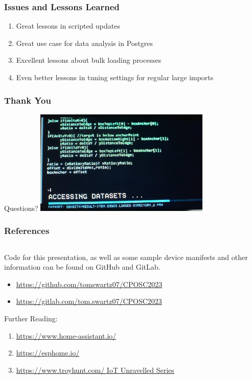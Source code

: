 \documentclass[aspectratio=169]{beamer}
\begin{document}
\begin{frame}[fragile]
  \frametitle{Issues and Lessons Learned}
  \begin{enumerate}
    \item{Great lessons in scripted updates}
    \item{Great use case for data analysis in Postgres}
    \item{Excellent lessons about bulk loading processes}
    \item{Even better lessons in tuning settings for regular large imports}
  \end{enumerate}
\end{frame}

\begin{frame}
  \frametitle{Thank You}
  \begin{center}
    \LARGE{Questions?}
    \vfill
    \includegraphics[height=5cm]{images/lol-code.jpg}
  \end{center}
\end{frame}
\begin{frame}
  \frametitle{References}
  \begin{columns}[]
    \begin{column}[T]{0.55\paperwidth}
      Code for this presentation, as well as some sample device manifests and other
      information can be found on GitHub and GitLab.
      \begin{itemize}
        \item{\href{https://github.com/tomswartz07/CPOSC2023}{https://github.com/tomswartz07/CPOSC2023}}
        \item{\href{https://gitlab.com/tom.swartz07/CPOSC2023}{https://gitlab.com/tom.swartz07/CPOSC2023}}
      \end{itemize}
      \vfill
      Further Reading:
      \begin{enumerate}
        \item{\href{https://www.home-assistant.io/}{https://www.home-assistant.io/}}
        \item{\href{https://esphome.io/}{https://esphome.io/}}
        \item{\href{https://www.troyhunt.com/iot-unravelled-part-1-its-a-mess-but-then-theres-home-assistant/}{https://www.troyhunt.com/ IoT Unravelled Series}}
      \end{enumerate}
    \end{column}
    \begin{column}[T]{0.35\paperwidth}
    \end{column}
  \end{columns}
\end{frame}
\end{document}
